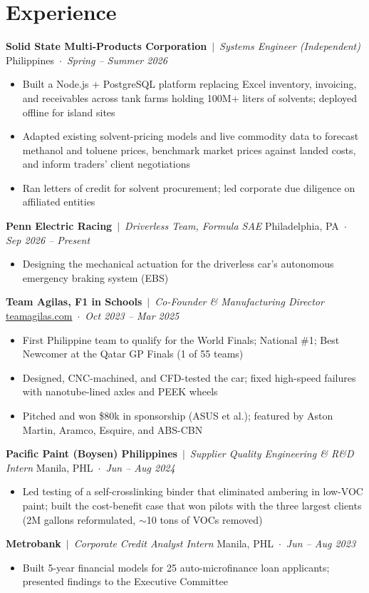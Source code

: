 \documentclass[10pt,letterpaper]{article}
\newcommand{\entry}[4]{\textbf{#1} \,$|$\, \textit{#2} \hfill #3 \,$\cdot$\, \textit{#4}\par}
\begin{document}
\section*{Experience}
\entry{Solid State Multi-Products Corporation}{Systems Engineer (Independent)}{Philippines}{Spring -- Summer 2026}
\begin{itemize}
  \item Built a Node.js + PostgreSQL platform replacing Excel inventory, invoicing, and receivables across tank farms holding 100M+ liters of solvents; deployed offline for island sites
  \item Adapted existing solvent-pricing models and live commodity data to forecast methanol and toluene prices, benchmark market prices against landed costs, and inform traders' client negotiations
  \item Ran letters of credit for solvent procurement; led corporate due diligence on affiliated entities
\end{itemize}
\vspace{3pt}
\entry{Penn Electric Racing}{Driverless Team, Formula SAE}{Philadelphia, PA}{Sep 2026 -- Present}
\begin{itemize}
  \item Designing the mechanical actuation for the driverless car's autonomous emergency braking system (EBS)
\end{itemize}
\vspace{3pt}
\entry{Team Agilas, F1 in Schools}{Co-Founder \& Manufacturing Director}{\href{https://teamagilas.com}{teamagilas.com}}{Oct 2023 -- Mar 2025}
\begin{itemize}
  \item First Philippine team to qualify for the World Finals; National \#1; Best Newcomer at the Qatar GP Finals (1 of 55 teams)
  \item Designed, CNC-machined, and CFD-tested the car; fixed high-speed failures with nanotube-lined axles and PEEK wheels
  \item Pitched and won \$80k in sponsorship (ASUS et al.); featured by Aston Martin, Aramco, Esquire, and ABS-CBN
\end{itemize}
\vspace{3pt}
\entry{Pacific Paint (Boysen) Philippines}{Supplier Quality Engineering \& R\&D Intern}{Manila, PHL}{Jun -- Aug 2024}
\begin{itemize}
  \item Led testing of a self-crosslinking binder that eliminated ambering in low-VOC paint; built the cost-benefit case that won pilots with the three largest clients (2M gallons reformulated, $\sim$10 tons of VOCs removed)
\end{itemize}
\vspace{3pt}
\entry{Metrobank}{Corporate Credit Analyst Intern}{Manila, PHL}{Jun -- Aug 2023}
\begin{itemize}
  \item Built 5-year financial models for 25 auto-microfinance loan applicants; presented findings to the Executive Committee
\end{itemize}
\end{document}

